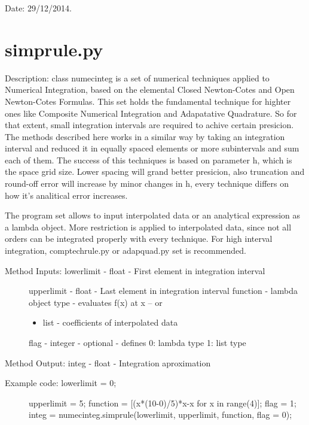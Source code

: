 \documentclass[letterpaper,10pt,oneside]{sphinxmanual}
\theoremstyle{plain}%
\theoremstyle{definition}%
\theoremstyle{remark}%
\begin{document}
Date: 29/12/2014.


\section{simprule.py}
\label{code:simprule-py}\label{code:module-simprule}
Description: class numecinteg is a set of numerical techniques applied to
Numerical Integration, based on the elemental Closed Newton-Cotes and
Open Newton-Cotes Formulas. This set holds the fundamental technique for
highter ones like Composite Numerical Integration and Adapatative Quadrature.
So for that extent, small integration intervals are required to achive certain
presicion. The methods described here works in a similar way by taking an
integration interval and reduced it in equally spaced elements or more 
subintervals and sum each of them. The success of this techniques is based
on parameter h, which is the space grid size. Lower spacing will grand better
presicion, also truncation and round-off error will increase by minor changes
in h, every technique differs on how it's analitical error increases.

The program set allows to input interpolated data or an analytical expression
as a lambda object. More restriction is applied to interpolated data, since
not all orders can be integrated properly with every technique. For high 
interval integration, comptechrule.py or adapquad.py set is recommended.
\begin{description}
\item[{Method Inputs: lowerlimit - float - First element in integration interval}] \leavevmode
upperlimit - float - Last element in integration interval
function - lambda object type - evaluates f(x) at x -- or
\begin{itemize}
\item {} 
list - coefficients of interpolated data

\end{itemize}

flag - integer - optional - defines 0: lambda type 1: list type

\end{description}

Method Output: integ - float - Integration aproximation
\begin{description}
\item[{Example code: lowerlimit = 0;}] \leavevmode
upperlimit = 5;
function = {[}(x*(10-0)/5)*x-x for x in range(4){]};
flag = 1;
integ =                   numecinteg.simprule(lowerlimit, upperlimit, function, flag = 0);

\end{description}
\end{document}
